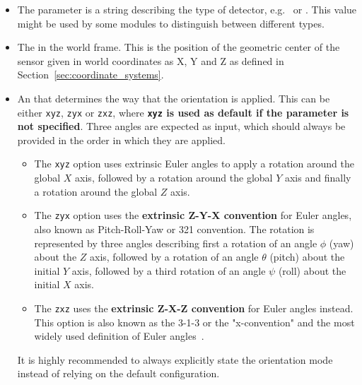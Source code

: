 \begin{itemize}
\item The  parameter is a string describing the type of detector, e.g.\  or . This value might be used by some modules to distinguish between different types.
\item The  in the world frame.
This is the position of the geometric center of the sensor given in world coordinates as X, Y and Z as defined in Section~\ref{sec:coordinate_systems}.
\item An  that determines the way that the orientation is applied.
This can be either \texttt{xyz}, \texttt{zyx} or \texttt{zxz}, where \textbf{\texttt{xyz} is used as default if the parameter is not specified}. Three angles are expected as input, which should always be provided in the order in which they are applied.
\begin{itemize}
    \item The \texttt{xyz} option uses extrinsic Euler angles to apply a rotation around the global $X$ axis, followed by a rotation around the global $Y$ axis and finally a rotation around the global $Z$ axis.
    \item The \texttt{zyx} option uses the \textbf{extrinsic Z-Y-X convention} for Euler angles, also known as Pitch-Roll-Yaw or 321 convention. The rotation is represented by three angles describing first a rotation of an angle $\phi$ (yaw) about the $Z$ axis, followed by a rotation of an angle $\theta$ (pitch) about the initial $Y$ axis, followed by a third rotation of an angle $\psi$ (roll) about the initial $X$ axis.
    \item The \texttt{zxz} uses the \textbf{extrinsic Z-X-Z convention} for Euler angles instead. This option is also known as the 3-1-3 or the "x-convention" and the most widely used definition of Euler angles~\cite{eulerangles}.
\end{itemize}
\begin{warning}
It is highly recommended to always explicitly state the orientation mode instead of relying on the default configuration.
\end{warning}


\end{itemize}
